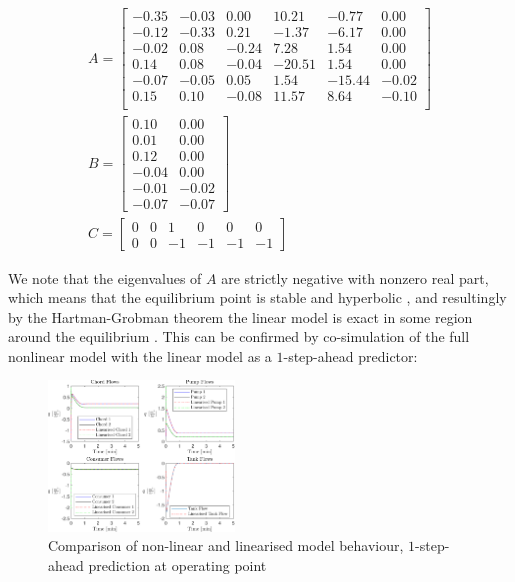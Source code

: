\begin{equation}\label{eq:LinearisedModelWithTank}
\begin{gathered}
	A = \begin{bmatrix}
		-0.35 & -0.03 & 0.00 & 10.21 & -0.77 & 0.00\\
		-0.12 & -0.33 & 0.21 & -1.37 & -6.17  & 0.00\\
		-0.02 & 0.08 & -0.24 & 7.28 & 1.54 & 0.00\\
		0.14 & 0.08 & -0.04 & -20.51 & 1.54 & 0.00\\
		-0.07 & -0.05 & 0.05 & 1.54 & -15.44 &   -0.02\\
		0.15 & 0.10 & -0.08 & 11.57 & 8.64 & -0.10\\
	\end{bmatrix} \\
	B = \begin{bmatrix}
		0.10 & 0.00\\
		0.01 & 0.00 \\
		0.12 & 0.00 \\
		-0.04 & 0.00 \\
		-0.01 & -0.02\\
		-0.07 & -0.07
	\end{bmatrix}
\\
		C = \begin{bmatrix} 
			0 & 0 & 1 & 0 & 0 & 0	\\		
			0 & 0 & -1 & -1 & -1 & -1
		\end{bmatrix}
\end{gathered}
\end{equation}

We note that the eigenvalues of $A$ are strictly negative with nonzero real part, which means that the equilibrium point is stable and hyperbolic \cite{Khalil}, and resultingly by the Hartman-Grobman theorem the linear model is exact in some region around the equilibrium \cite{Perko2001}. This can be confirmed by co-simulation of the full nonlinear model with the linear model as a $1$-step-ahead predictor:


\begin{figure}[h]
	\centering
	\includegraphics[height = 4cm,width=\linewidth]{Graphics/NominalFlows.pdf}
	\caption{Comparison of non-linear and linearised model behaviour, $1$-step-ahead prediction at operating point}
	\label{fig:CompNonLinEQ}
\end{figure}

